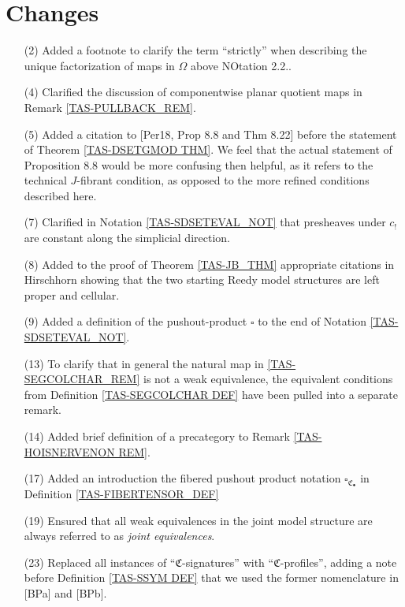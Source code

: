 \documentclass[a4paper,10pt
]{article}%
\numberwithin{equation}{section}
\numberwithin{figure}{section}
\theoremstyle{definition} %
\newcommand{\1}{\ensuremath{\mathbbm 1}}%
\begin{document}
\section{Changes}

\begin{enumerate}
\item[(2)] Added a footnote to clarify the term ``strictly'' when describing the unique factorization of maps in $\Omega$ above NOtation 2.2..
\item[(4)] Clarified the discussion of componentwise planar quotient maps in Remark \ref{TAS-PULLBACK_REM}.
\item[(5)] Added a citation to [Per18, Prop 8.8 and Thm 8.22] before the statement of Theorem \ref{TAS-DSETGMOD THM}.
        We feel that the actual statement of Proposition 8.8 would be more confusing then helpful, as it refers to the technical $J$-fibrant condition, as opposed to the more refined conditions described here.
\item[(7)] Clarified in Notation \ref{TAS-SDSETEVAL_NOT} that presheaves under $c_!$ are constant along the simplicial direction.
\item[(8)] Added to the proof of Theorem \ref{TAS-JB_THM} appropriate citations in Hirschhorn showing that the two starting Reedy model structures are left proper and cellular.
\item[(9)] Added a definition of the pushout-product $\square$ to the end of Notation \ref{TAS-SDSETEVAL_NOT}.
\item[(13)] To clarify that in general the natural map in \ref{TAS-SEGCOLCHAR_REM} is not a weak equivalence, the equivalent conditions from Definition \ref{TAS-SEGCOLCHAR DEF} have been pulled into a separate remark.
\item[(14)] Added brief definition of a precategory to Remark \ref{TAS-HOISNERVENON REM}.
\item[(17)] Added an introduction the fibered pushout product notation $\square_{\mathfrak C_\bullet}$ in Definition \ref{TAS-FIBERTENSOR_DEF}
\item[(19)] Ensured that all weak equivalences in the joint model structure are always referred to as \textit{joint equivalences}.
\item[(23)] Replaced all instances of ``$\mathfrak C$-signatures'' with ``$\mathfrak C$-profiles'', adding a note before Definition \ref{TAS-SSYM DEF} that we used the former nomenclature in [BPa] and [BPb].

\end{enumerate}
\end{document}
